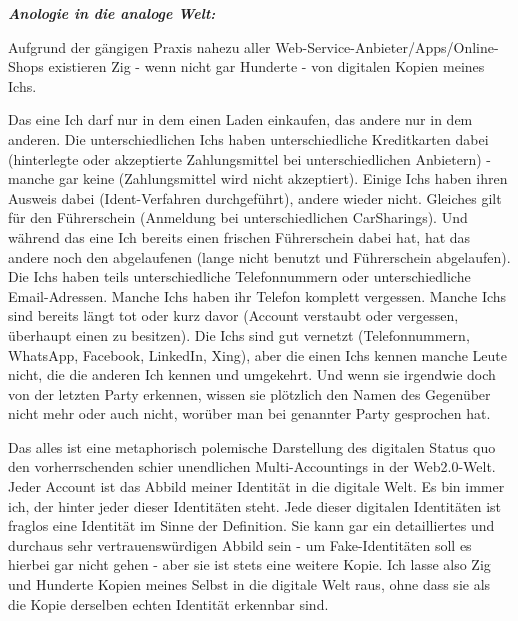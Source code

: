 \vspace{0.3cm}


\vspace{0.3cm}

\textbf{\textit{Anologie in die analoge Welt:}}

\vspace{0.3cm}

Aufgrund der gängigen Praxis nahezu aller Web-Service-Anbieter/Apps/Online-Shops existieren Zig - wenn nicht gar Hunderte - von digitalen Kopien meines Ichs. 

Das eine Ich darf nur in dem einen Laden einkaufen, das andere nur in dem anderen. Die unterschiedlichen Ichs haben unterschiedliche Kreditkarten dabei (hinterlegte oder akzeptierte Zahlungsmittel bei unterschiedlichen Anbietern) - manche gar keine (Zahlungsmittel wird nicht akzeptiert). Einige Ichs haben ihren Ausweis dabei (Ident-Verfahren durchgeführt), andere wieder nicht. Gleiches gilt für den Führerschein (Anmeldung bei unterschiedlichen CarSharings). Und während das eine Ich bereits einen frischen Führerschein dabei hat, hat das andere noch den abgelaufenen (lange nicht benutzt und Führerschein abgelaufen). Die Ichs haben teils unterschiedliche Telefonnummern oder unterschiedliche Email-Adressen. Manche Ichs haben ihr Telefon komplett vergessen. Manche Ichs sind bereits längt tot oder kurz davor (Account verstaubt oder vergessen, überhaupt einen zu besitzen). Die Ichs sind gut vernetzt (Telefonnummern, WhatsApp, Facebook, LinkedIn, Xing), aber die einen Ichs kennen manche Leute nicht, die die anderen Ich kennen und umgekehrt. Und wenn sie irgendwie doch von der letzten Party erkennen, wissen sie plötzlich den Namen des Gegenüber nicht mehr oder auch nicht, worüber man bei genannter Party gesprochen hat.

Das alles ist eine metaphorisch polemische Darstellung des digitalen Status quo den vorherrschenden schier unendlichen Multi-Accountings in der Web2.0-Welt. Jeder Account ist das Abbild meiner Identität in die digitale Welt. Es bin immer ich, der hinter jeder dieser Identitäten steht. Jede dieser digitalen Identitäten ist fraglos eine Identität im Sinne der Definition. Sie kann gar ein detailliertes und durchaus sehr vertrauenswürdigen Abbild sein - um Fake-Identitäten soll es hierbei gar nicht gehen - aber sie ist stets eine weitere Kopie. Ich lasse also Zig und Hunderte Kopien meines Selbst in die digitale Welt raus, ohne dass sie als die Kopie derselben echten Identität erkennbar sind.

